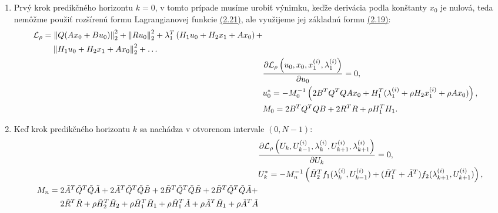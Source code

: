 \begin{enumerate}
	\item{Prvý krok predikčného horizontu $k = 0$, v tomto prípade musíme urobiť výnimku, keďže derivácia podla konštanty $x_0$ je nulová, teda nemôžme použiť rozšírenú formu Lagrangianovej funkcie \hyperref[math:RozsirenyLag]{(2.21)}, ale využijeme jej základnú formu  \hyperref[math:RozsirenyLag]{(2.19)}:\\
		\begin{subequations}
			\begin{align}
				\begin{split}
					&\mathcal{L}_{\rho} =\left\lVert Q(Ax_{0}+Bu_{0})\right\rVert^{2}_{2}+\left\lVert Ru_{0}\right\rVert^{2}_{2} +\lambda_{1}^{T}\left(H_{1}u_{0} + H_{2}x_{1} + Ax_{0} \right)+\\&\hspace{0.8cm}\left\lVert H_{1}u_{0} + H_{2}x_{1} + Ax_{0}\right\rVert_{2}^{2}+\dots
				\end{split}\\
				&\frac{\partial \mathcal{L}_{\rho}\left(u_{0},x_{0},x_{1}^{(i)},\lambda_{1}^{(i)}\right)}{\partial u_{0}} = 0,\\
				&u_{0}^{*} = -M_{0}^{-1}\left(2B^{T}Q^{T}QAx_{0}+H_{1}^{T}(\lambda_{1}^{(i)}+\rho H_{2}x_{1}^{(i)}+\rho Ax_{0})\right),\\
				&M_{0} = 2B^{T}Q^{T}QB + 2R^{T}R +\rho H_{1}^{T}H_{1}.
			\end{align}
		\end{subequations}
	}
	\item{Keď krok predikčného horizontu $k$ sa nachádza v otvorenom intervale $\left(0,N-1\right)$:\\
		\begin{subequations}
			\begin{align}
				&\frac{\partial \mathcal{L}_{\rho}\left(U_{k},U_{k-1}^{(i)},\lambda_{k}^{(i)},U_{k+1}^{(i)},\lambda_{k+1}^{(i)}\right)}{\partial U_{k}} = 0,\\
				&U_{k}^{*} = -M_{n}^{-1}\left(\tilde{H}_{2}^{T}f_{1}(\lambda_{k}^{(i)},U_{k-1}^{(i)})+(\tilde{H}_{1}^{T}+\tilde{A}^{T})f_{2}(\lambda_{k+1}^{(i)},U_{k+1}^{(i)})\right),\\
				\begin{split}
					& M_{n} = 2\tilde{A}^{T}\tilde{Q}^{T}\tilde{Q}\tilde{A}+2\tilde{A}^{T}\tilde{Q}^{T}\tilde{Q}\tilde{B}+2\tilde{B}^{T}\tilde{Q}^{T}\tilde{Q}\tilde{B}+2\tilde{B}^{T}\tilde{Q}^{T}\tilde{Q}\tilde{A}+\\
					&\hspace{1.0cm}2\tilde{R}^{T}\tilde{R} + \rho\tilde{H}_{2}^{T}\tilde{H}_{2}+ \rho\tilde{H}_{1}^{T}\tilde{H}_{1} + \rho\tilde{H}_{1}^{T}\tilde{A} + \rho\tilde{A}^{T}\tilde{H}_{1}+ \rho\tilde{A}^{T}\tilde{A}

\end{split}
\end{align}
\end{subequations}}
\end{enumerate}
